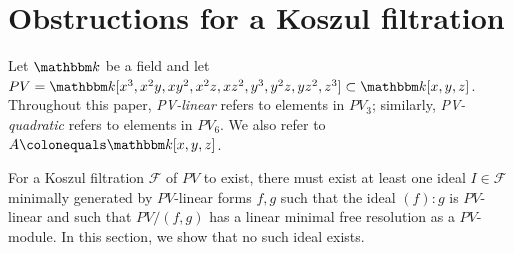 \section{Obstructions for a Koszul filtration}
\noindent
Let $\K$ be a field and let $PV=\K[x^3,x^2y,xy^2,x^2z,xz^2,y^3,y^2z,yz^2,z^3]\subset \K[x,y,z]$. Throughout this paper, \emph{PV-linear} refers to elements in $PV_3$; similarly, \emph{PV-quadratic} refers to elements in $PV_6$. We also refer to $A\colonequals\K[x,y,z]$.

For a Koszul filtration $\mathcal{F}$ of $PV$ to exist, there must exist at least one ideal $I\in \mathcal{F}$ minimally generated by $PV$-linear forms $f,g$ such that the ideal $(f):g$ is $PV$-linear and such that $PV/(f,g)$ has a linear minimal free resolution as a $PV$-module. 
In this section, we show that no such ideal exists. 

